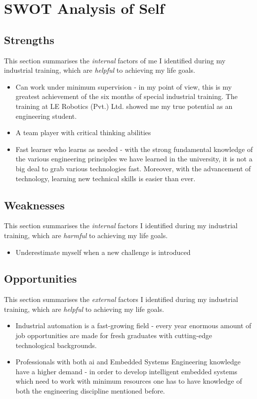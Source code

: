 \documentclass[a4paper,12pt]{report}
\begin{document}
\section{SWOT Analysis of Self}


\subsection{Strengths}

This section summarises the \textit{internal} factors of me I identified during my industrial training, which are \textit{helpful} to achieving my life goals.
\begin{itemize}
	\item Can work under minimum supervision - in my point of view, this is my greatest achievement of the six months of special industrial training. The training at  LE Robotics (Pvt.) Ltd. showed me my true potential as an engineering student.
	
	\item A team player with critical thinking abilities  
	
	\item Fast learner who learns as needed - with the strong fundamental knowledge of the various engineering principles we have learned in the university, it is not a big deal to grab various technologies fast. Moreover, with the advancement of technology, learning new technical skills is easier than ever.
\end{itemize} 


\subsection{Weaknesses}
This section summarises the \textit{internal} factors I identified during my industrial training, which are \textit{harmful} to achieving my life goals.
\begin{itemize}
	\item Underestimate myself when a new 
	challenge is introduced
\end{itemize} 


\subsection{Opportunities}
This section summarises the \textit{external} factors I identified during my industrial training, which are \textit{helpful} to achieving my life goals.
\begin{itemize}
	\item Industrial automation is a fast-growing field - every year enormous amount of job opportunities are made for fresh graduates with cutting-edge technological backgrounds.
	
	\item Professionals with both \ac{ai} and Embedded 
	Systems Engineering knowledge have a 
	higher demand - in order to develop intelligent embedded systems which need to work with minimum resources one has to have knowledge of both the engineering discipline mentioned before.
\end{itemize}
\end{document}
